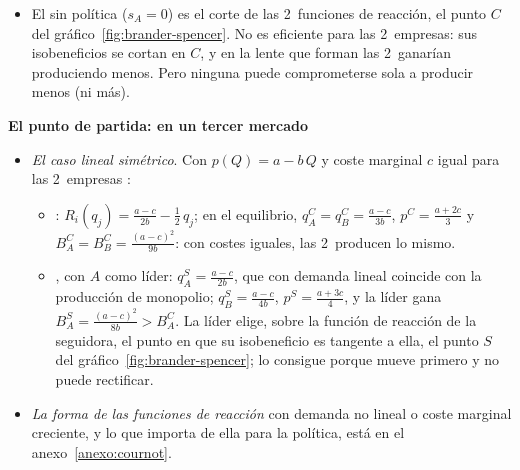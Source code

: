 \documentclass[11pt]{article}
\begin{document}
\begin{itemize}
\begin{itemize}
  \item $p'(Q)-C_i''(q_i)<0$: la demanda corta al coste marginal desde arriba.
  \end{itemize}
  Con ellas, $R_i'\in(-1,0)$: el equilibrio de  existe, es único, porque la aplicación de mejores respuestas es una contracción, y es estable con el ajuste de , en el que cada empresa responde a lo que la otra hizo el periodo anterior\nocite{Hahn1962Stability,Vives1999Oligopoly} (anexo~\ref{anexo:cournot}).
\item El  sin política ($s_A=0$) es el corte de las 2~funciones de reacción, el punto $C$ del gráfico~\ref{fig:brander-spencer}. No es eficiente para las 2~empresas: sus isobeneficios se cortan en $C$, y en la lente que forman las 2~ganarían produciendo menos. Pero ninguna puede comprometerse sola a producir menos (ni más).
\end{itemize}

\begin{anotaciones}
\textbf{El punto de partida:  en un tercer mercado}
\begin{itemize}
\item \emph{El caso lineal simétrico}. Con $p(Q)=a-b\,Q$ y coste marginal $c$ igual para las 2~empresas :
  \begin{itemize}
  \item {}: $R_i(q_j)=\frac{a-c}{2b}-\frac{1}{2}\,q_j$; en el equilibrio, $q_A^C=q_B^C=\frac{a-c}{3b}$, $p^C=\frac{a+2c}{3}$ y $B_A^C=B_B^C=\frac{(a-c)^2}{9b}$: con costes iguales, las 2~producen lo mismo.
  \item {}, con $A$ como líder: $q_A^S=\frac{a-c}{2b}$, que con demanda lineal coincide con la producción de monopolio; $q_B^S=\frac{a-c}{4b}$, $p^S=\frac{a+3c}{4}$, y la líder gana $B_A^S=\frac{(a-c)^2}{8b}>B_A^C$. La líder elige, sobre la función de reacción de la seguidora, el punto en que su isobeneficio es tangente a ella, el punto $S$ del gráfico~\ref{fig:brander-spencer}; lo consigue porque mueve primero y no puede rectificar\nocite{Stackelberg1934Marktform}.
  \end{itemize}
\item \emph{La forma de las funciones de reacción} con demanda no lineal o coste marginal creciente, y lo que importa de ella para la política, está en el anexo~\ref{anexo:cournot}.
\end{itemize}
\end{anotaciones}
\end{document}
